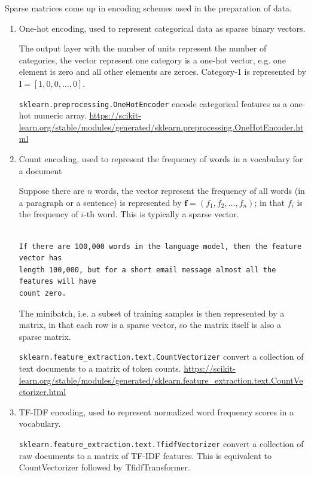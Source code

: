 Sparse matrices come up in encoding schemes used in the preparation of data.
\begin{enumerate}
  \item One-hot encoding, used to represent categorical data as sparse binary vectors. 
  
  The output layer with the number of units represent the number of categories, the vector represent one category 
  is a one-hot vector, e.g. one element is zero and all other elements are zeroes. Category-1 is represented by 
  $\mathbf{l} = [1,0,0,\ldots,0]$.
  
  \verb!sklearn.preprocessing.OneHotEncoder! encode categorical features as a one-hot numeric array.
  \url{https://scikit-learn.org/stable/modules/generated/sklearn.preprocessing.OneHotEncoder.html}
  
  \item Count encoding, used to represent the frequency of words in a vocabulary for a document
  
  Suppose there are $n$ words, the vector represent the frequency of all words
  (in a paragraph or a sentence) is represented by $\mathbf{f}= (f_1, f_2,
  \ldots, f_n)$; in that $f_i$ is the frequency of $i$-th word. This is typically a sparse vector.
  
\begin{verbatim}

If there are 100,000 words in the language model, then the feature vector has
length 100,000, but for a short email message almost all the features will have
count zero.
\end{verbatim}

  The minibatch, i.e. a subset of training samples is then represented by a matrix, in that each row is a sparse vector, so 
  the matrix itself is also a sparse matrix.
  
  \verb!sklearn.feature_extraction.text.CountVectorizer! convert a collection of text documents to a matrix of token counts.
  \url{https://scikit-learn.org/stable/modules/generated/sklearn.feature_extraction.text.CountVectorizer.html}
  
  \item TF-IDF encoding, used to represent normalized word frequency scores in a vocabulary.
 
 \verb!sklearn.feature_extraction.text.TfidfVectorizer! convert a collection of raw documents to a matrix of TF-IDF features.
 This is equivalent to CountVectorizer followed by TfidfTransformer.
 
\end{enumerate}

